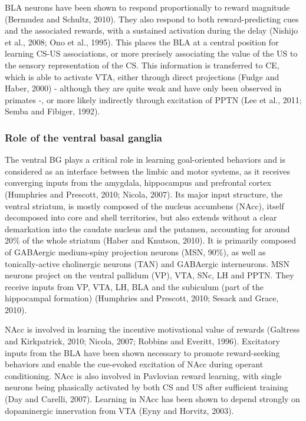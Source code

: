 \documentclass[
  11pt,
  a4paper,
]{scrbook}
\begin{document}
BLA neurons have been shown to respond proportionally to reward
magnitude (Bermudez and Schultz, 2010). They also respond to both
reward-predicting cues and the associated rewards, with a sustained
activation during the delay (Nishijo et al., 2008; Ono et al., 1995).
This places the BLA at a central position for learning CS-US
associations, or more precisely associating the value of the US to the
sensory representation of the CS. This information is transferred to CE,
which is able to activate VTA, either through direct projections (Fudge
and Haber, 2000) - although they are quite weak and have only been
observed in primates -, or more likely indirectly through excitation of
PPTN (Lee et al., 2011; Semba and Fibiger, 1992).

\subsubsection*{Role of the ventral basal
ganglia}\label{role-of-the-ventral-basal-ganglia}

The ventral BG plays a critical role in learning goal-oriented behaviors
and is considered as an interface between the limbic and motor systems,
as it receives converging inputs from the amygdala, hippocampus and
prefrontal cortex (Humphries and Prescott, 2010; Nicola, 2007). Its
major input structure, the ventral striatum, is mostly composed of the
nucleus accumbens (NAcc), itself decomposed into core and shell
territories, but also extends without a clear demarkation into the
caudate nucleus and the putamen, accounting for around 20\% of the whole
striatum (Haber and Knutson, 2010). It is primarily composed of
GABAergic medium-spiny projection neurons (MSN, 90\%), as well as
tonically-active cholinergic neurons (TAN) and GABAergic interneurons.
MSN neurons project on the ventral pallidum (VP), VTA, SNc, LH and PPTN.
They receive inputs from VP, VTA, LH, BLA and the subiculum (part of the
hippocampal formation) (Humphries and Prescott, 2010; Sesack and Grace,
2010).

NAcc is involved in learning the incentive motivational value of rewards
(Galtress and Kirkpatrick, 2010; Nicola, 2007; Robbins and Everitt,
1996). Excitatory inputs from the BLA have been shown necessary to
promote reward-seeking behaviors and enable the cue-evoked excitation of
NAcc during operant conditioning. NAcc is also involved in Pavlovian
reward learning, with single neurons being phasically activated by both
CS and US after sufficient training (Day and Carelli, 2007). Learning in
NAcc has been shown to depend strongly on dopaminergic innervation from
VTA (Eyny and Horvitz, 2003).
\end{document}
